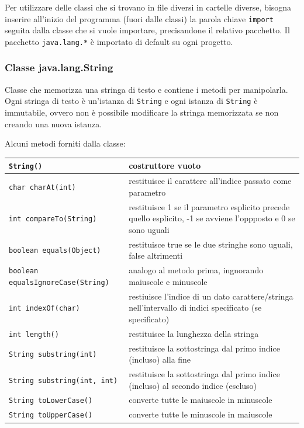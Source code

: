 \documentclass{article}
\begin{document}
Per utilizzare delle classi che si trovano in file diversi in cartelle diverse, bisogna inserire all'inizio del programma (fuori dalle classi)
la parola chiave \verb|import| seguita dalla classe che si vuole importare, precisandone il relativo pacchetto. Il pacchetto \verb|java.lang.*|
è importato di default su ogni progetto.

\newpage


\subsubsection*{Classe java.lang.String}
Classe che memorizza una stringa di testo e contiene i metodi per manipolarla. Ogni stringa di testo è un'istanza di \verb|String| e ogni istanza di
\verb|String| è immutabile, ovvero non è possibile modificare la stringa memorizzata se non creando una nuova istanza.

Alcuni metodi forniti dalla classe:
\begin{center}
	\begin{tabularx}{\textwidth}{l X}
		\toprule
		\verb|String()| & costruttore vuoto \\
		\midrule
		\verb|char charAt(int)| & restituisce il carattere all'indice passato come parametro \\
		\midrule
		\verb|int compareTo(String)| & restituisce 1 se il parametro esplicito precede quello esplicito, -1 se avviene l'oppposto e 0 se sono uguali \\
		\midrule
		\verb|boolean equals(Object)| & restituisce true se le due stringhe sono uguali, false altrimenti \\
		\midrule
		\verb|boolean equalsIgnoreCase(String)| & analogo al metodo prima, ingnorando maiuscole e minuscole \\
		\midrule
		\verb|int indexOf(char)| & restiuisce l'indice di un dato carattere/stringa nell'intervallo di indici specificato (se specificato) \\
		\midrule
		\verb|int length()| & restituisce la lunghezza della stringa \\
		\midrule
		\verb|String substring(int)| & restituisce la sottostringa dal primo indice (incluso) alla fine \\
		\midrule
		\verb|String substring(int, int)| & restituisce la sottostringa dal primo indice (incluso) al secondo indice (escluso) \\
		\midrule
		\verb|String toLowerCase()| & converte tutte le maiuscole in minuscole \\
		\midrule
		\verb|String toUpperCase()| & converte tutte le minuscole in maiuscole \\
		\bottomrule
	\end{tabularx}
\end{center}
\end{document}
